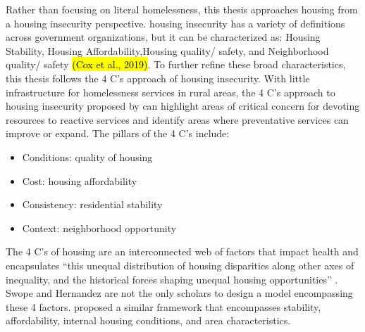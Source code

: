 Rather than focusing on literal homelessness, this thesis approaches housing from a housing insecurity perspective. housing insecurity has a variety of definitions across government organizations, but it can be characterized as: Housing Stability, Housing Affordability,Housing quality/ safety, and Neighborhood quality/ safety \hl{(Cox et al., 2019)}. To further refine these broad characteristics, this thesis follows the 4 C's approach of housing insecurity. With little infrastructure for homelessness services in rural areas, the 4 C’s approach to housing insecurity proposed by \citet{swope_housing_2020} can highlight areas of critical concern for devoting resources to reactive services and identify areas where preventative services can improve or expand. The pillars of the 4 C's include:
\begin{itemize}
    \item{Conditions: quality of housing}
    \item{Cost: housing affordability}
    \item{Consistency: residential stability}
    \item{Context: neighborhood opportunity }
\end{itemize}
The 4 C’s of housing are an interconnected web of factors that impact health and encapsulates “this unequal distribution of housing disparities along other axes of inequality, and the historical forces shaping unequal housing opportunities” \citep[1]{hernandez_housing_2019}. Swope and Hernandez are not the only scholars to design a model encompassing these 4 factors. \citet{metzger_fair_2017} proposed a similar framework that encompasses stability, affordability, internal housing conditions, and area characteristics. 

